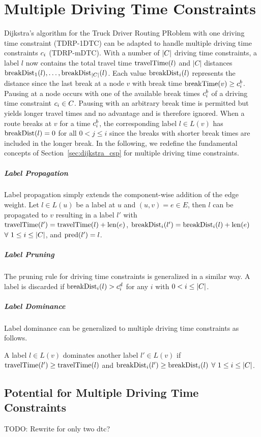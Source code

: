 \section{Multiple Driving Time Constraints\label{section:n_csp}}
Dijkstra's algorithm for the Truck Driver Routing PRoblem with one driving time constraint (TDRP-1DTC) can be adapted to handle multiple driving time constraints $c_i$ (TDRP-mDTC). With a number of $|C|$ driving time constraints, a label $l$ now contains the total travel time $\operatorname{travelTime}(l)$ and $|C|$ distances $\operatorname{breakDist}_1(l), \ldots , \operatorname{breakDist}_{|C|}(l)$. Each value $\operatorname{breakDist}_i(l)$ represents the distance since the last break at a node $v$ with break time $\operatorname{breakTime}(v) \ge c_i^b$. Pausing at a node occurs with one of the available break times $c_i^b$ of a driving time constraint $c_i \in C$. Pausing with an arbitrary break time is permitted but yields longer travel times and no advantage and is therefore ignored. When a route breaks at $v$ for a time $c_i^b$, the corresponding label $l \in L(v)$ has $\operatorname{breakDist}(l) = 0$ for all $0 < j \le i$ since the breaks with shorter break times are included in the longer break. In the following, we redefine the fundamental concepts of Section~\ref{sec:dijkstra_csp} for multiple driving time constraints.

\subparagraph{Label Propagation}
Label propagation simply extends the component-wise addition of the edge weight. Let $l \in L(u)$ be a label at $u$ and $(u,v) = e \in E$, then $l$ can be propagated to $v$ resulting in a label $l'$ with $\operatorname{travelTime}(l') = \operatorname{travelTime}(l) + \operatorname{len}(e)$, $\operatorname{breakDist}_i(l') = \operatorname{breakDist}_i(l) + \operatorname{len}(e)$ $\forall\ 1 \le i \le |C|$, and $\operatorname{pred}(l') = l$.

\subparagraph{Label Pruning}
The pruning rule for driving time constraints is generalized in a similar way. A label is discarded if $\operatorname{breakDist}_i(l) > c_i^d$ for any $i$ with $0 < i \le |C|$.


\subparagraph{Label Dominance}
Label dominance can be generalized to multiple driving time constraints as follows.

\begin{definition}
	A label $l \in L(v)$ dominates another label $l' \in L(v)$ if $\operatorname{travelTime}(l') \ge \operatorname{travelTime}(l)$ and $\operatorname{breakDist}_i(l') \ge \operatorname{breakDist}_i(l)$ $\forall\ 1 \le i \le |C|$.
\end{definition}

\subsection{Potential for Multiple Driving Time Constraints\label{section:potential_n_csp}}
TODO: Rewrite for only two dtc?

